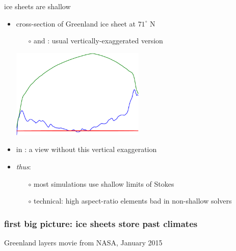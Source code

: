 \documentclass[hide notes,intlimits]{beamer}
\begin{document}
\begin{frame}{ice sheets are shallow}

\begin{itemize}
\item cross-section of Greenland ice sheet at $71^\circ$ N
\small
  \begin{itemize}
  \item[$\circ$] {\color{dark green}{green}} and {\color{dark blue}{blue}}: usual vertically-exaggerated version
  \end{itemize}
  \begin{center}
    \includegraphics[width=0.5\textwidth]{newgreentrans}
  \end{center}
\normalsize
\item in {\color{dark red}{red}}: a view without this vertical exaggeration
\item \emph{thus}: 
  \begin{itemize}
  \item[$\circ$] most simulations use shallow limits of Stokes
  \item[$\circ$] \scriptsize technical: high aspect-ratio elements bad in non-shallow solvers
  \end{itemize}
\end{itemize}
\end{frame}


\begin{frame}
  \frametitle{first big picture: ice sheets store past climates}
Greenland layers movie from NASA, January 2015
\end{frame}
\end{document}
